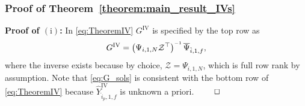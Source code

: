 \subsubsection{Proof of Theorem~\ref{theorem:main_result_IVs}}\label{sec:proof_IVs}
\noindent\textbf{Proof of $(\mathrm{i})$:} In \eqref{eq:TheoremIV} $G^\mathrm{IV}$ is specified by the top row as
\begin{align}\label{eq:G_sols}
    G^\mathrm{IV} = \left(\Psi_{i,1,N}\mathcal{Z}^\top\right)\inv\overline{\Psi}_{\hat{i},1,f},
\end{align}
where the inverse exists because by choice, $\mathcal{Z}=\Psi_{i,1,N}$, which is full row rank by assumption. Note that \eqref{eq:G_sols} is consistent with the bottom row of \eqref{eq:TheoremIV} because $\widehat{Y}_{\hat{i}_p,1,f}^\mathrm{IV}$ is unknown a priori. $\hfill\qed$
% 


